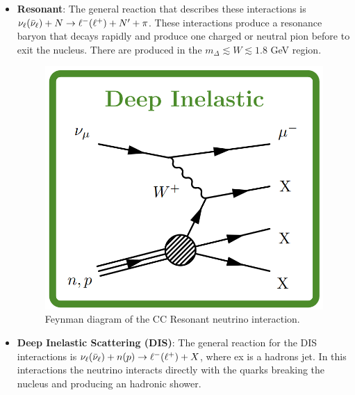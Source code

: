 \begin{itemize}
    \item \textbf{Resonant}: The general reaction that describes these interactions is $\nu_\ell(\Bar{\nu}_\ell) + N\rightarrow \ell^- (\ell^+) + N' + \pi$. These interactions produce a resonance baryon that decays rapidly and produce one charged or neutral pion before to exit the nucleus. There are produced in the $m_\Delta \lesssim W \lesssim 1.8$ GeV region.

    \begin{figure}[!htb]
        \centering
        \includegraphics[scale=0.25]{Figures/Chapter1/DISChannel.png}
        \caption{Feynman diagram of the CC Resonant neutrino interaction.}
        \label{fig:Int:NuInteractions:CCRESFeynman}
    \end{figure}
    
    \item \textbf{Deep Inelastic Scattering (DIS)}: The general reaction for the DIS interactions is $\nu_\ell(\Bar{\nu}_\ell) + n(p)\rightarrow \ell^- (\ell^+) + X$, where ex is a hadrons jet. In this interactions the neutrino interacts directly with the quarks breaking the nucleus and producing an hadronic shower.


\end{itemize}
